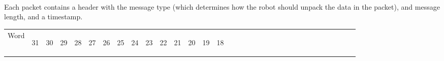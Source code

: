 \documentclass[11pt]{article}
\begin{document}
\paragraph{}
Each packet contains a header with the message type (which determines how the robot should unpack the data in the packet),
and message length, and a timestamp.
\newline
\begin{table}[h]
    \centering
    \label{tab:headerDef}
    \begin{tabular}{|p{1cm}|m{0.04cm}|m{0.04cm}|m{0.04cm}|m{0.04cm}|m{0.04cm}|m{0.04cm}|m{0.04cm}|m{0.04cm}|m{0.04cm}|
        m{0.04cm}|m{0.04cm}|m{0.04cm}|m{0.04cm}|m{0.04cm}|m{0.04cm}|m{0.04cm}|m{0.04cm}|m{0.04cm}|m{0.04cm}|m{0.04cm}|
        m{0.04cm}|m{0.04cm}|m{0.04cm}|m{0.04cm}|m{0.04cm}|m{0.04cm}|m{0.04cm}|m{0.04cm}|m{0.04cm}|m{0.04cm}|m{0.04cm}|m{0.04cm}|}
        \hline
        Word & 
        \begin{sideways}31\end{sideways} &
        \begin{sideways}30\end{sideways} & 
        \begin{sideways}29\end{sideways} &
        \begin{sideways}28\end{sideways} &
        \begin{sideways}27\end{sideways} &
        \begin{sideways}26\end{sideways} &
        \begin{sideways}25\end{sideways} &
        \begin{sideways}24\end{sideways} &
        \begin{sideways}23\end{sideways} &
        \begin{sideways}22\end{sideways} &
        \begin{sideways}21\end{sideways} &
        \begin{sideways}20\end{sideways} &
        \begin{sideways}19\end{sideways} &
        \begin{sideways}18\end{sideways} &

\end{tabular}
\end{table}
\end{document}
